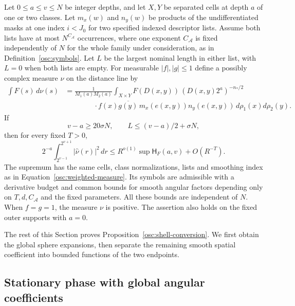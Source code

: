 \begin{proposition}\label{osc:shell-conversion}
Let $0\le a\le v\le N$ be integer depths, and let $X,Y$ be separated
cells at depth $a$ of one or two classes.  Let
$m_x(w)$ and $n_y(w)$ be products of the undifferentiated masks at one
index $i<J_0$ for two specified indexed descriptor lists.  Assume both
lists have at most $N^{C_{\mathcal A}}$ occurrences, where one exponent
$C_{\mathcal A}$ is fixed independently of $N$ for the whole family under
consideration, as in Definition~\ref{osc:symbols}.  Let $L$ be the largest
nominal length in either list, with $L=0$ when both lists are empty.
For measurable $|f|,|g|\le1$
define a possibly complex measure $\nu$ on the distance line by
\begin{equation}\label{osc:weighted-measure}
 \begin{aligned}
 \int F(s)\,d\nu(s)
 &=\frac1{M_1(a)M_2(a)}
   \int_{X\times Y} F(D(x,y))\,
       (D(x,y)2^a)^{-n_*/2}\\
 &\qquad\qquad\cdot f(x)\overline{g(y)}\,
       m_x(e(x,y))n_y(e(x,y))\,
       d\rho_1(x)d\rho_2(y).
 \end{aligned}
\end{equation}
If
\begin{equation}\label{osc:shell-regime}
 v-a\ge20\sigma N,\qquad L\le(v-a)/2+\sigma N,
\end{equation}
then for every fixed $T>0$,
\begin{equation}\label{osc:shell-estimate}
 2^{-a}\int_{2^{v-1}}^{2^{v+1}}|\widehat\nu(r)|^2\,dr
 \le R^{o(1)}\sup\mathsf H_F(a,v)+O(R^{-T}).
\end{equation}
The supremum has the same cells, class normalizations, lists and
smoothing index as in Equation~\eqref{osc:weighted-measure}.  Its symbols
are admissible with a derivative budget and common bounds for smooth angular factors
depending only on $T,d,C_{\mathcal A}$ and the fixed parameters.  All
these bounds are independent of $N$.
When $f=g=1$, the measure $\nu$ is positive.  The assertion also holds on
the fixed outer supports with $a=0$.
\end{proposition}

The rest of this Section proves Proposition~\ref{osc:shell-conversion}.
We first obtain the global sphere expansions, then separate the remaining
smooth spatial coefficient into bounded functions of the two endpoints.

\subsection{Stationary phase with global angular coefficients}

